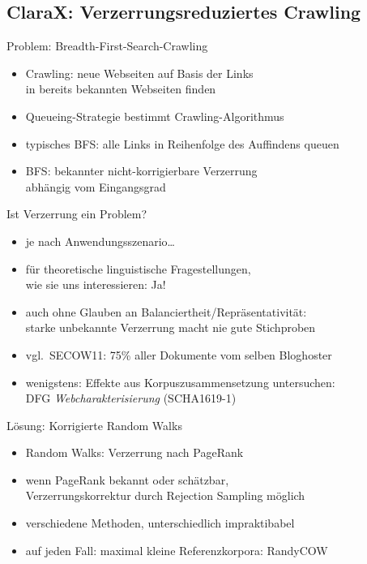\subsection{ClaraX: Verzerrungsreduziertes Crawling}

\begin{frame}
  {Problem: Breadth-First-Search-Crawling}
  \begin{itemize}
    \item Crawling: neue Webseiten auf Basis der Links\\
      in bereits bekannten Webseiten finden
    \item Queueing-Strategie bestimmt Crawling-Algorithmus
    \item typisches BFS: alle Links in Reihenfolge des Auffindens queuen
      \vspace{0.5cm}
    \item BFS: bekannter nicht-korrigierbare Verzerrung\\
      abhängig vom \alert{Eingangsgrad}
  \end{itemize}
\end{frame}

\begin{frame}
  {Ist Verzerrung ein Problem?}
  \begin{itemize}
    \item je nach Anwendungsszenario\ldots
    \item für theoretische linguistische Fragestellungen,\\
      wie sie uns interessieren: \alert{Ja!}
    \item auch ohne Glauben an Balanciertheit/Repräsentativität:\\
      starke unbekannte Verzerrung macht \alert{nie} gute Stichproben
    \item vgl.\ SECOW11: 75\% aller Dokumente vom selben Bloghoster
      \vspace{0.5cm}
    \item wenigstens: Effekte aus Korpuszusammensetzung untersuchen:\\
      DFG \textit{Webcharakterisierung} (SCHA1619-1)
  \end{itemize}
\end{frame}

\begin{frame}
  {Lösung: Korrigierte Random Walks}
  \begin{itemize}
    \item Random Walks: Verzerrung nach \alert{PageRank}
    \item wenn PageRank bekannt oder schätzbar,\\
      Verzerrungskorrektur durch Rejection Sampling möglich
    \item verschiedene Methoden, unterschiedlich impraktibabel
    \item auf jeden Fall: maximal kleine Referenzkorpora: \alert{RandyCOW}
  \end{itemize}
\end{frame}


